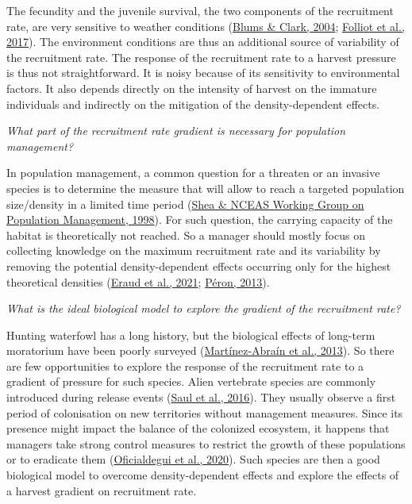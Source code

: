 \documentclass[
  english,
]{article}
\begin{document}
The fecundity and the juvenile survival, the two components of the recruitment rate, are very sensitive to weather conditions (\protect\hyperlink{ref-Blums2004}{Blums \& Clark, 2004}; \protect\hyperlink{ref-Folliot2017}{Folliot et al., 2017}). The environment conditions are thus an additional source of variability of the recruitment rate. The response of the recruitment rate to a harvest pressure is thus not straightforward. It is noisy because of its sensitivity to environmental factors. It also depends directly on the intensity of harvest on the immature individuals and indirectly on the mitigation of the density-dependent effects.

\emph{What part of the recruitment rate gradient is necessary for population management?}

In population management, a common question for a threaten or an invasive species is to determine the measure that will allow to reach a targeted population size/density in a limited time period (\protect\hyperlink{ref-Shea1998}{Shea \& NCEAS Working Group on Population Management, 1998}). For such question, the carrying capacity of the habitat is theoretically not reached. So a manager should mostly focus on collecting knowledge on the maximum recruitment rate and its variability by removing the potential density-dependent effects occurring only for the highest theoretical densities (\protect\hyperlink{ref-Eraud2021}{Eraud et al., 2021}; \protect\hyperlink{ref-Peron2013}{Péron, 2013}).

\emph{What is the ideal biological model to explore the gradient of the recruitment rate?}

Hunting waterfowl has a long history, but the biological effects of long-term moratorium have been poorly surveyed (\protect\hyperlink{ref-MartinezAbrain2013}{Martínez-Abraín et al., 2013}). So there are few opportunities to explore the response of the recruitment rate to a gradient of pressure for such species. Alien vertebrate species are commonly introduced during release events (\protect\hyperlink{ref-Saul2016}{Saul et al., 2016}). They usually observe a first period of colonisation on new territories without management measures. Since its presence might impact the balance of the colonized ecosystem, it happens that managers take strong control measures to restrict the growth of these populations or to eradicate them (\protect\hyperlink{ref-Oficialdegui2020}{Oficialdegui et al., 2020}). Such species are then a good biological model to overcome density-dependent effects and explore the effects of a harvest gradient on recruitment rate.
\end{document}
